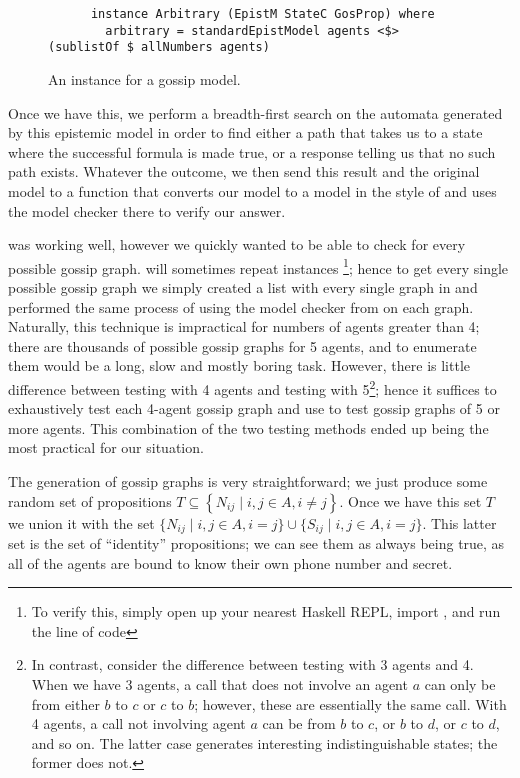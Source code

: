 \documentclass[10pt, a4paper]{report}
\begin{document}
\begin{figure}[h]
  \centering
  \begin{verbatim}
      instance Arbitrary (EpistM StateC GosProp) where
        arbitrary = standardEpistModel agents <$> (sublistOf $ allNumbers agents)
  \end{verbatim}
  \caption{An  instance for a gossip model.}
  \label{fig:Arbitrary}
\end{figure}

Once we have this, we perform a breadth-first search on the automata generated
by this epistemic model in order to find either a path that takes us to a state
where the successful formula is made true, or a response telling us that no such
path exists. Whatever the outcome, we then send this result and the original
model to a function that converts our model to a model in the style of
\cite{GithubGossip} and uses the model checker there to verify our answer.

 was working well, however we quickly wanted to be able to check
for every possible gossip graph.  will sometimes repeat
instances \footnote{To verify this, simply open up your nearest Haskell REPL,
  import , and run the line of code }; hence to get every single
possible gossip graph we simply created a list with every single graph in and
performed the same process of using the model checker from \cite{GithubGossip}
on each graph. Naturally, this technique is impractical for numbers of agents
greater than 4; there are thousands of possible gossip graphs for 5 agents, and
to enumerate them would be a long, slow and mostly boring task. However, there
is little difference between testing with 4 agents and testing with
5\footnote{In contrast, consider the difference between testing with 3 agents
  and 4. When we have 3 agents, a call that does not involve an agent $a$ can
  only be from either $b$ to $c$ or $c$ to $b$; however, these are essentially
  the same call. With 4 agents, a call not involving agent $a$ can be from $b$
  to $c$, or $b$ to $d$, or $c$ to $d$, and so on. The latter case generates
  interesting indistinguishable states; the former does not.}; hence it suffices
to exhaustively test each 4-agent gossip graph and use  to test
gossip graphs of 5 or more agents. This combination of the two testing methods
ended up being the most practical for our situation.

The generation of gossip graphs is very straightforward; we just produce some
random set of propositions $T \subseteq \left\{ N_{ij} \mid i, j \in A, i \not =
  j \right\}$. Once we have this set $T$ we union it with the set 
$\{N_{ij} \mid i, j \in A, i = j\} \cup \{S_{ij} \mid i, j \in A,
i = j\}$. This latter set is the set of ``identity'' propositions; we can see
them as always being true, as all of the agents are bound to know their own
phone number and secret.
\end{document}
